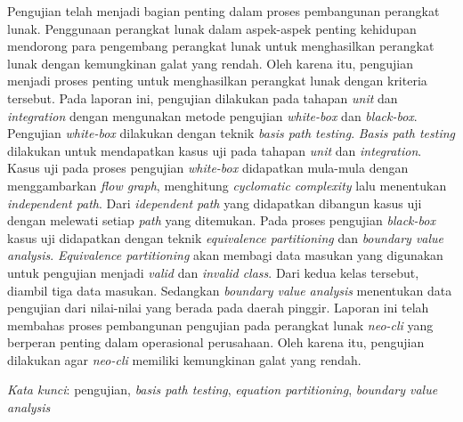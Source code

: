 \documentclass{pkl}
\begin{document}
{\abstractind

  Pengujian telah menjadi bagian penting dalam proses pembangunan
  perangkat lunak. Penggunaan perangkat lunak dalam aspek-aspek
  penting kehidupan mendorong para pengembang perangkat lunak untuk
  menghasilkan perangkat lunak dengan kemungkinan galat yang
  rendah. Oleh karena itu, pengujian menjadi proses penting untuk
  menghasilkan perangkat lunak dengan kriteria tersebut. Pada laporan
  ini, pengujian dilakukan pada tahapan \emph{unit} dan
  \emph{integration} dengan mengunakan metode pengujian
  \emph{white-box} dan \emph{black-box}. Pengujian \emph{white-box}
  dilakukan dengan teknik \emph{basis path testing}. \emph{Basis path
    testing} dilakukan untuk mendapatkan kasus uji pada tahapan
  \emph{unit} dan \emph{integration}. Kasus uji pada proses pengujian
  \emph{white-box} didapatkan mula-mula dengan menggambarkan
  \emph{flow graph}, menghitung \emph{cyclomatic complexity} lalu
  menentukan \emph{independent path}. Dari \emph{idependent path} yang
  didapatkan dibangun kasus uji dengan melewati setiap \emph{path}
  yang ditemukan. Pada proses pengujian \emph{black-box} kasus uji
  didapatkan dengan teknik \emph{equivalence partitioning} dan
  \emph{boundary value analysis}. \emph{Equivalence partitioning} akan
  membagi data masukan yang digunakan untuk pengujian menjadi
  \emph{valid} dan \emph{invalid class}. Dari kedua kelas tersebut,
  diambil tiga data masukan. Sedangkan \emph{boundary value analysis}
  menentukan data pengujian dari nilai-nilai yang berada pada daerah
  pinggir. Laporan ini telah membahas proses pembangunan pengujian
  pada perangkat lunak \emph{neo-cli} yang berperan penting dalam
  operasional perusahaan. Oleh karena itu, pengujian dilakukan agar
  \emph{neo-cli} memiliki kemungkinan galat yang rendah.

  \emph{Kata kunci}: pengujian, \emph{basis path testing},
  \emph{equation partitioning}, \emph{boundary value analysis}


}
\end{document}
